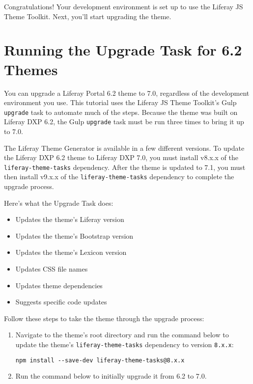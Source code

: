 Congratulations! Your development environment is set up to use the
Liferay JS Theme Toolkit. Next, you'll start upgrading the theme.

\chapter{Running the Upgrade Task for 6.2
Themes}\label{running-the-upgrade-task-for-6.2-themes}

You can upgrade a Liferay Portal 6.2 theme to 7.0, regardless of the
development environment you use. This tutorial uses the Liferay JS Theme
Toolkit's Gulp \texttt{upgrade} task to automate much of the steps.
Because the theme was built on Liferay DXP 6.2, the Gulp
\texttt{upgrade} task must be run three times to bring it up to 7.0.

The Liferay Theme Generator is available in a few different versions. To
update the Liferay DXP 6.2 theme to Liferay DXP 7.0, you must install
v8.x.x of the \texttt{liferay-theme-tasks} dependency. After the theme
is updated to 7.1, you must then install v9.x.x of the
\texttt{liferay-theme-tasks} dependency to complete the upgrade process.

Here's what the Upgrade Task does:

\begin{itemize}
\tightlist
\item
  Updates the theme's Liferay version
\item
  Updates the theme's Bootstrap version
\item
  Updates the theme's Lexicon version
\item
  Updates CSS file names
\item
  Updates theme dependencies
\item
  Suggests specific code updates
\end{itemize}

Follow these steps to take the theme through the upgrade process:

\begin{enumerate}
\def\labelenumi{\arabic{enumi}.}
\item
  Navigate to the theme's root directory and run the command below to
  update the theme's \texttt{liferay-theme-tasks} dependency to version
  \texttt{8.x.x}:

\begin{verbatim}
npm install --save-dev liferay-theme-tasks@8.x.x
\end{verbatim}
\item
  Run the command below to initially upgrade it from 6.2 to 7.0.
\end{enumerate}

